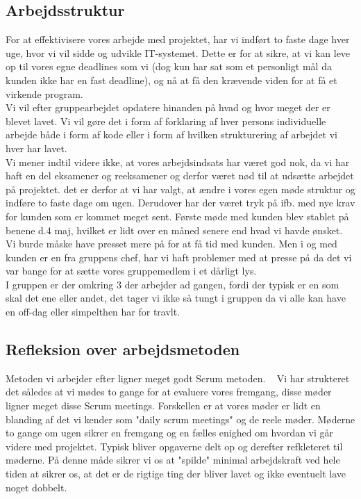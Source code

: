\documentclass[a4paper]{article}
\begin{document}
\subsection{Arbejdsstruktur}
For at effektivisere vores arbejde med projektet, har vi indført to faste dage hver uge, hvor vi vil sidde og udvikle IT-systemet. Dette er for at sikre, at vi kan leve op til vores egne deadlines som vi (dog kun har sat som et personligt mål da kunden ikke har en fast deadline), og nå at få den krævende viden for at få et virkende program.\\
Vi vil efter gruppearbejdet opdatere hinanden på hvad og hvor meget der er blevet lavet. Vi vil gøre det i form af forklaring af hver persons individuelle arbejde både i form af kode eller i form af hvilken strukturering af arbejdet vi hver har lavet.\\
Vi mener indtil videre ikke, at vores arbejdsindsats har været god nok, da vi har haft en del eksamener og reeksamener og derfor været nød til at udsætte arbejdet på projektet. det er derfor at vi har valgt, at ændre i vores egen møde struktur og indføre to faste dage om ugen.
Derudover har der været tryk på ifb. med nye krav for kunden som er kommet meget sent. Første møde med kunden blev stablet på benene d.4 maj, hvilket er lidt over en måned senere end hvad vi havde ønsket. Vi burde  måske have presset mere på for at få tid med kunden. Men i og med kunden er en fra gruppens chef, har vi haft problemer med at presse på da det vi var bange for at sætte vores gruppemedlem i et dårligt lys.\\
I gruppen er der omkring 3 der arbejder ad gangen, fordi der typisk er en som skal det ene eller andet, det tager vi ikke så tungt i gruppen da vi alle kan have en off-dag eller simpelthen har for travlt.\\
\subsection{Refleksion over arbejdsmetoden}
Metoden vi arbejder efter ligner meget godt Scrum metoden. ~\cite{Scrum} Vi har strukteret det således at vi mødes to gange for at evaluere vores fremgang, disse møder ligner meget disse Scrum meetings. Forskellen er at vores møder er lidt en blanding af det vi kender som "daily scrum meetings" og de reele møder. Møderne to gange om ugen sikrer en fremgang og en fælles enighed om hvordan vi går videre med projektet. Typisk bliver opgaverne delt op og derefter refkleteret til møderne. På denne måde sikrer vi os at "spilde" minimal arbejdskraft ved hele tiden at sikrer os, at det er de rigtige ting der bliver lavet og ikke eventuelt lave noget dobbelt.\\ 
\newpage
\end{document}
